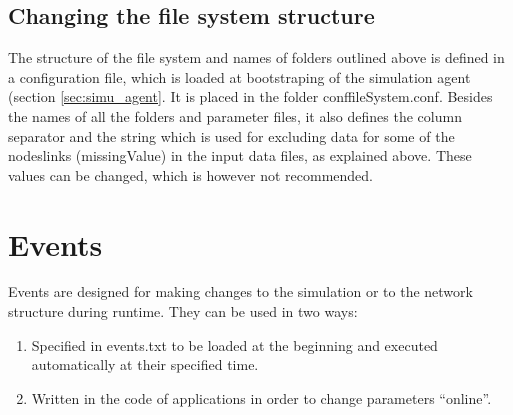 \documentclass[11pt,fleqn]{book} %
\begin{document}
\subsection{Changing the file system structure}
The structure of the file system and names of folders outlined above is defined in a configuration file, which is loaded at bootstraping of the simulation agent (section \ref{sec:simu_agent}. It is placed in the folder conf\/fileSystem.conf. Besides the names of all the folders and parameter files, it also defines the column separator and the string which is used for excluding data for some of the nodes\/links (missingValue) in the input data files, as explained above. These values can be changed, which is however not recommended.


\section{Events}\label{sec:events}
Events are designed for making changes to the simulation or to the network structure during runtime. They can be used in two ways:
\begin{enumerate}
	\item Specified in events.txt to be loaded at the beginning and executed automatically at their specified time. 
	\item Written in the code of applications in order to change parameters “online”.
\end{enumerate}
\end{document}
